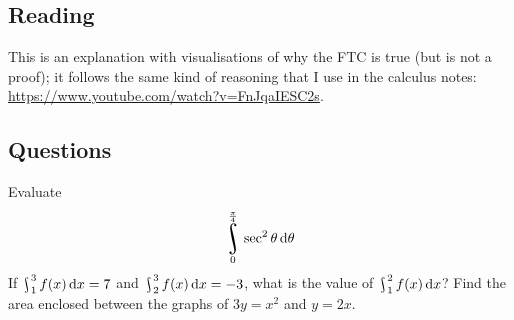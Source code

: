 


\subsection*{Reading}
This is an explanation with visualisations of why the FTC is true (but is not a proof); it follows the same kind
of reasoning that I use in the calculus notes: \url{https://www.youtube.com/watch?v=FnJqaIESC2s}.

\subsection*{Questions}
\begin{questions}
  \question Evaluate
    \begin{displaymath}
      \rint^{\frac{\pi}{4}}_0 \sec^2 \theta \dif{\theta}
    \end{displaymath}
  \question If $ \rint^3_1 f(x) \dif{x} = 7 $ and $ \rint^3_2 f(x) \dif{x} = -3 $, what is the value of $ \rint^2_1 f(x) \dif{x} $?
  \question Find the area enclosed between the graphs of $ 3y = x^2 $ and $ y = 2x $.
\end{questions}

